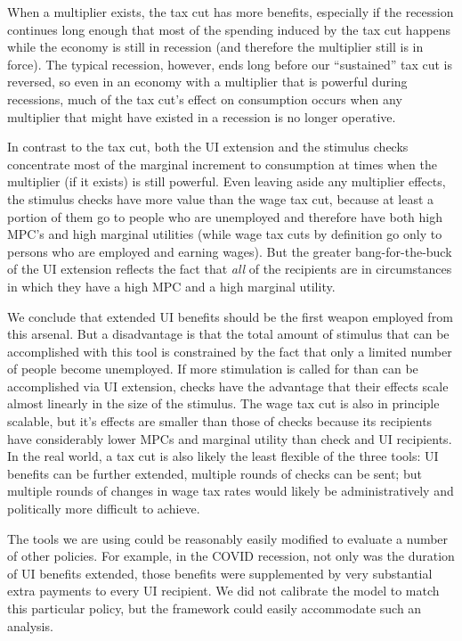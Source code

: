 \documentclass[../HAFiscal]{subfiles}
\begin{document}
When a multiplier exists, the tax cut has more benefits, especially if the recession continues long enough that most of the spending induced by the tax cut happens while the economy is still in recession (and therefore the multiplier still is in force).  The typical recession, however, ends long before our ``sustained'' tax cut is reversed, so even in an economy with a multiplier that is powerful during recessions, much of the tax cut's effect on consumption occurs when any multiplier that might have existed in a recession is no longer operative.

In contrast to the tax cut, both the UI extension and the stimulus checks concentrate most of the marginal increment to consumption at times when the multiplier (if it exists) is still powerful.  Even leaving aside any multiplier effects, the stimulus checks have more value than the wage tax cut, because at least a portion of them go to people who are unemployed and therefore have both high MPC's and high marginal utilities (while wage tax cuts by definition go only to persons who are employed and earning wages).  But the greater bang-for-the-buck of the UI extension reflects the fact that \textit{all} of the recipients are in circumstances in which they have a high MPC and a high marginal utility.

We conclude that extended UI benefits should be the first weapon employed from this arsenal.  But a disadvantage is that the total amount of stimulus that can be accomplished with this tool is constrained by the fact that only a limited number of people become unemployed.  If more stimulation is called for than can be accomplished via UI extension, checks have the advantage that their effects scale almost linearly in the size of the stimulus.  The wage tax cut is also in principle scalable, but it's effects are smaller than those of checks because its recipients have considerably lower MPCs and marginal utility than check and UI recipients.  In the real world, a tax cut is also likely the least flexible of the three tools:  UI benefits can be further extended, multiple rounds of checks can be sent; but multiple rounds of changes in wage tax rates would likely be administratively and politically more difficult to achieve.

The tools we are using could be reasonably easily modified to evaluate a number of other policies.  For example, in the COVID recession, not only was the duration of UI benefits extended, those benefits were supplemented by very substantial extra payments to every UI recipient.  We did not calibrate the model to match this particular policy, but the framework could easily accommodate such an analysis.
\end{document}
